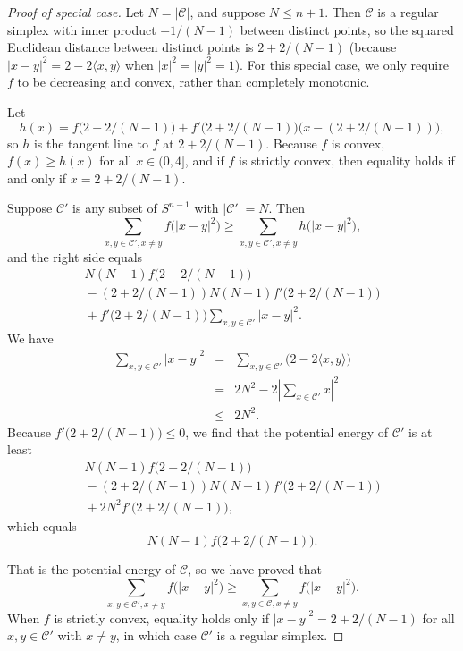 \documentclass{jams-l}
\theoremstyle{plain}
\numberwithin{theorem}{section}
\theoremstyle{definition}
\numberwithin{equation}{section}
\newcommand{\CodeS}{\mathcal{C}}
\newcommand{\CodeT}{\mathcal{C}'}
\begin{document}
\begin{proof}[Proof of special case]
Let $N = |\CodeS|$, and suppose $N \le n+1$.  Then $\CodeS$ is a
regular simplex with inner product $-1/(N-1)$ between distinct
points, so the squared Euclidean distance between distinct points
is $2+2/(N-1)$ (because $|x-y|^2 = 2-2\langle x,y \rangle$ when
$|x|^2=|y|^2=1$).  For this special case, we only require $f$ to
be decreasing and convex, rather than completely monotonic.

Let
$$
h(x) = f\big(2+2/(N-1)\big) +
f'\big(2+2/(N-1)\big)\big(x-(2+2/(N-1))\big),
$$
so $h$ is the tangent line to $f$ at $2+2/(N-1)$.  Because $f$ is
convex, $f(x) \ge h(x)$ for all $x \in (0,4]$, and if $f$ is
strictly convex, then equality holds if and only if $x =
2+2/(N-1)$.

Suppose $\CodeT$ is any subset of $S^{n-1}$ with $|\CodeT|=N$.
Then
$$
\sum_{x,y \in \CodeT, x \ne y} f\big(|x-y|^2\big) \ge \sum_{x,y
\in \CodeT, x \ne y} h\big(|x-y|^2\big),
$$
and the right side equals
\begin{eqnarray*}
N(N-1)f\big(2+2/(N-1)\big)\\
\phantom{} -
(2+2/(N-1))N(N-1)f'\big(2+2/(N-1)\big)\\
\phantom{} + f'\big(2+2/(N-1)\big)\sum_{x,y \in \CodeT} |x-y|^2.
\end{eqnarray*}
We have
\begin{eqnarray*}
\sum_{x,y \in \CodeT} |x-y|^2 &=& \sum_{x,y \in \CodeT}
\big(2-2\langle x,y \rangle\big)\\
&=& 2N^2 - 2 \left|\sum_{x \in \CodeT} x\right|^2\\
&\le& 2N^2.
\end{eqnarray*}
Because $f'\big(2+2/(N-1)\big) \le 0$, we find that the potential
energy of $\CodeT$ is at least
\begin{eqnarray*}
N(N-1)f\big(2+2/(N-1)\big)\\
\phantom{} -
(2+2/(N-1))N(N-1)f'\big(2+2/(N-1)\big)\\
\phantom{} + 2N^2f'\big(2+2/(N-1)\big),
\end{eqnarray*}
which equals
$$
N(N-1)f\big(2+2/(N-1)\big).
$$

That is the potential energy of $\CodeS$, so we have proved that
$$
\sum_{x,y \in \CodeT, x \ne y} f\big(|x-y|^2\big) \ge \sum_{x,y
\in \CodeS, x \ne y} f\big(|x-y|^2\big).
$$
When $f$ is strictly convex, equality holds only if
$|x-y|^2=2+2/(N-1)$ for all $x,y \in \CodeT$ with $x \ne y$, in
which case $\CodeT$ is a regular simplex.
\end{proof}
\end{document}
